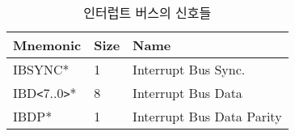 %
%
\begin{table}[htbp]
\caption{인터럽트 버스의 신호들}\label{table:ib-signal}
   \begin{center}
   \begin{tabular}{|l|l|l|} \hline
	Mnemonic & Size & Name \\
\hline \hline
	IBSYNC*                & 1 & Interrupt Bus Sync. \\
	IBD{\tt <}7..0{\tt >}* & 8 & Interrupt Bus Data \\
	IBDP*                  & 1 & Interrupt Bus Data Parity \\ \hline
   \end{tabular}
   \end{center}
\end{table}
%
%
